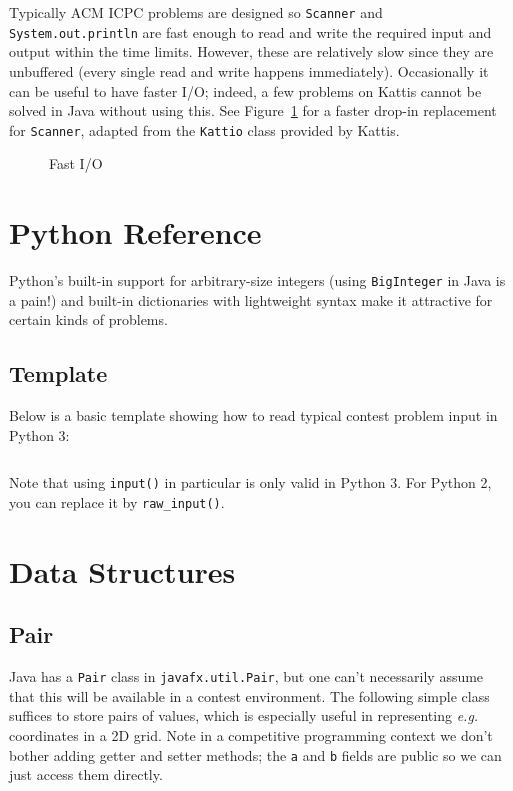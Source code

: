\documentclass[10pt]{book}
\newcommand{\pycode}[1]{\inputminted[linenos=true,mathescape]{python}{code/#1}}
\newif\iftodos
\newcommand{\todo}[1]{\iftodos\textcolor{red}{[TODO: #1]}\fi}
\newcommand{\eg}{\emph{e.g.}\xspace}
\begin{document}
Typically ACM ICPC problems are designed so \texttt{Scanner} and
\texttt{System.out.println} are fast enough to read and write the
required input and output within the time limits.  However, these are
relatively slow since they are unbuffered (every single read and write
happens immediately).  Occasionally it can be useful to have faster
I/O; indeed, a few problems on Kattis cannot be solved in Java without
using this. See Figure~\ref{fig:fastio} for a faster drop-in replacement for
\texttt{Scanner}, adapted from the \texttt{Kattio} class provided by
Kattis.

\begin{figure}
  \small
  \caption{Fast I/O}  \label{fig:fastio}
\end{figure}


\chapter{Python Reference} \label{chap:python}

Python's built-in support for arbitrary-size integers (using
\texttt{BigInteger} in Java is a pain!) and built-in dictionaries with
lightweight syntax make it attractive for certain kinds of problems.

\section{Template}

Below is a basic template showing how to read typical contest problem
input in Python 3:

\pycode{python/template.py}

Note that using \texttt{input()} in particular is only valid in Python
3.  For Python 2, you can replace it by \verb|raw_input()|.

\todo{Mention basic Python data structures such as set, deque, list methods}

\chapter{Data Structures}

\section{Pair}

Java has a \texttt{Pair} class in \texttt{javafx.util.Pair}, but one
can't necessarily assume that this will be available in a contest
environment.  The following simple class suffices to store pairs of
values, which is especially useful in representing \eg coordinates in
a 2D grid.  Note in a competitive programming context we don't bother
adding getter and setter methods; the \texttt{a} and
\texttt{b} fields are public so we can just access them directly.
\end{document}
